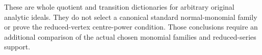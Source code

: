 \begin{remark}
These are whole quotient and transition dictionaries for arbitrary
original analytic ideals. They do not select a canonical standard
normal-monomial family or prove the reduced-vertex centre-power
condition. Those conclusions require an additional comparison of
the actual chosen monomial families and reduced-series support.
\end{remark}
